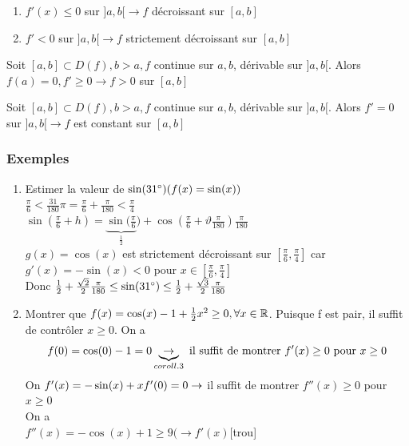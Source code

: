 \documentclass[12pt,a4paper]{article}
\begin{document}
{\begin{boite}
\begin{enumerate}[label=\roman*)]
		\item $f'(x) \leq 0$ sur $]a,b[ \to f$ décroissant sur $[a,b]$
		\item $f' < 0 $ sur $]a,b[\to f$ strictement décroissant sur $[a,b]$
	\end{enumerate}
\end{boite}
\begin{boite}
	 Soit $[a,b] \subset D(f), b>a, f$ continue sur ${a,b}$, dérivable sur $]a,b[$. Alors $f(a) = 0, f' \geq 0 \to f > 0$ sur $[a,b]$
\end{boite}
\begin{boite}
	 Soit $[a,b] \subset D(f), b>a, f$ continue sur ${a,b}$, dérivable sur $]a,b[$. Alors $f'=0$ sur $]a,b[ \to f$ est constant sur $[a,b]$
\end{boite}
\subsubsection{Exemples}
\begin{enumerate}[label=\roman*)]
	\item Estimer la valeur de $\sin(31\degree) (f(x) = \sin(x))$\\
		$\frac{\pi}{6} < \frac{31}{180}\pi = \frac{\pi}{6} + \frac{\pi}{180} < \frac{\pi}{4}$\\
		$\sin(\frac{\pi}{6} + h) = \underbrace{\sin(\frac{\pi}{6}}_{\frac{1}{2}}) + \cos(\frac{\pi}{6} + \vartheta \frac{\pi}{180})\frac{\pi}{180}$\\
		$g(x) = \cos(x)$ est strictement décroissant sur $[\frac{\pi}{6}, \frac{\pi}{4}]$ car $g'(x) = -\sin(x) < 0$ pour $x \in [\frac{\pi}{6},\frac{\pi}{4}]$\\
		Donc $\frac{1}{2} + \frac{\sqrt{2}}{2}\frac{\pi}{180} \leq \sin(31\degree) \leq \frac{1}{2} + \frac{\sqrt{3}}{2}\frac{\pi}{180}$ 	
		\item Montrer que $f(x) = \cos(x)-1+\frac{1}{2}x^2 \geq 0,\forall x \in \mathbb{R}
$. Puisque f est pair, il suffit de contrôler $x \geq 0$. On a
\begin{equation}
f(0) = \cos(0)-1 = 0 \underbrace{\to}_{coroll. 3}\mbox{ il suffit de montrer }f'(x) \geq 0 \mbox{ pour } x \geq 0
\end{equation}
On $f'(x) = -\sin(x) + x\\
f'(0) = 0 \to $ il suffit de montrer $f''(x) \geq 0$ pour $x \geq 0$\\
On a\\
$f''(x) = -\cos(x) + 1 \geq 9 (\to f'(x)$[trou]
\end{enumerate}
}
\end{document}
